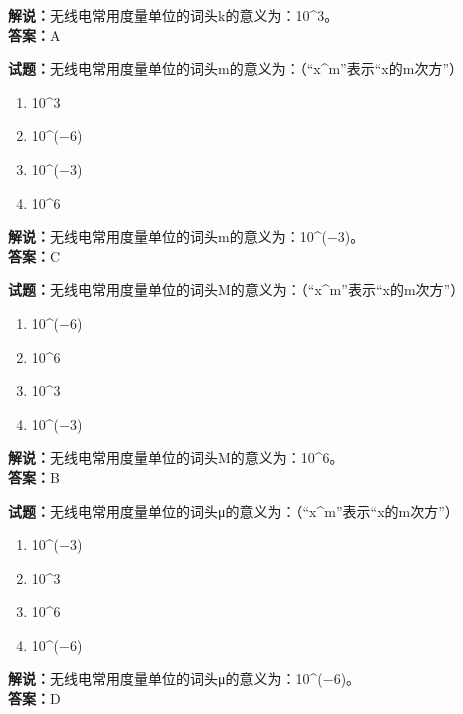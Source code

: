 \documentclass{ctexbook}
\begin{document}
\noindent\textbf{解说：}无线电常用度量单位的词头k的意义为：\num{10}\string^\num{3}。\cite[143]{si}\\
\noindent\textbf{答案：}A


\bigskip


\noindent\textbf{试题：}无线电常用度量单位的词头m的意义为：（“x\string^m”表示“x的m次方”）

\begin{enumerate}[leftmargin=3em]
	\item \num{10}\string^\num{3}
	\item \num{10}\string^(\num{-6})
	\item \num{10}\string^(\num{-3})
	\item \num{10}\string^\num{6}
\end{enumerate}

\noindent\textbf{解说：}无线电常用度量单位的词头m的意义为：\num{10}\string^(\num{-3})。\cite[143]{si}\\
\noindent\textbf{答案：}C


\bigskip


\noindent\textbf{试题：}无线电常用度量单位的词头M的意义为：（“x\string^m”表示“x的m次方”）

\begin{enumerate}[leftmargin=3em]
	\item \num{10}\string^(\num{-6})
	\item \num{10}\string^\num{6}
	\item \num{10}\string^\num{3}
	\item \num{10}\string^(\num{-3})
\end{enumerate}

\noindent\textbf{解说：}无线电常用度量单位的词头M的意义为：\num{10}\string^\num{6}。\cite[143]{si}\\
\noindent\textbf{答案：}B


\bigskip


\noindent\textbf{试题：}无线电常用度量单位的词头μ的意义为：（“x\string^m”表示“x的m次方”）

\begin{enumerate}[leftmargin=3em]
	\item \num{10}\string^(\num{-3})
	\item \num{10}\string^\num{3}
	\item \num{10}\string^\num{6}
	\item \num{10}\string^(\num{-6})
\end{enumerate}

\noindent\textbf{解说：}无线电常用度量单位的词头μ的意义为：\num{10}\string^(\num{-6})。\cite[143]{si}\\
\noindent\textbf{答案：}D
\end{document}
